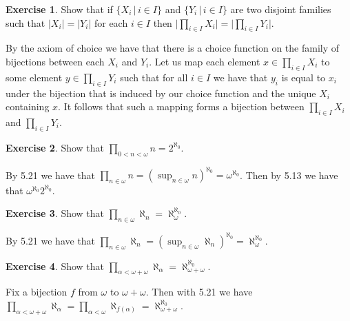 \documentclass{article}
\theoremstyle{definition}
\newtheorem{exer}{Exercise}[section]
\newcommand{\abs}[1]{\lvert#1\rvert}
\newlength{\defparindent}
\newenvironment{answer}
    {\begin{mdframed}[backgroundcolor=gray!15, linewidth=0pt] \setlength{\parindent}{\defparindent}}
    {\end{mdframed}}
\begin{document}
\begin{exer}
    Show that if $\{ X_i \, | \, i \in I \}$ and $\{ Y_i \, | \, i \in I \}$ are two disjoint families such that $\abs{X_i} = \abs{Y_i}$ for each $i \in I$ then $\abs{\prod_{i \in I} X_i} = \abs{\prod_{i \in I} Y_i}$.
    \begin{answer}
        By the axiom of choice we have that there is a choice function on the family of bijections between each $X_i$ and $Y_i$. Let us map each element $x \in \prod_{i \in I} X_i$ to some element $y \in \prod_{i \in I} Y_i$ such that for all $i \in I$ we have that $y_i$ is equal to $x_i$ under the bijection that is induced by our choice function and the unique $X_i$ containing $x$. It follows that such a mapping forms a bijection between $\prod_{i \in I} X_i$ and $\prod_{i \in I} Y_i$.
    \end{answer}
\end{exer}

\newpage

\begin{exer}
    Show that $\prod_{0 < n < \omega} n = 2^{\aleph_0}$.
    \begin{answer}

        By 5.21 we have that $\prod_{n \in \omega} n = (\sup_{n \in \omega} n)^{\aleph_0} = \omega^{\aleph_0}$. Then by 5.13 we have that $\omega^{\aleph_0} 2^{\aleph_0}$. 
    \end{answer}
\end{exer}

\begin{exer}
    Show that $\prod_{n \in \omega} \aleph_n = \aleph_{\omega}^{\aleph_0}$.
    \begin{answer}
        By 5.21 we have that $\prod_{n \in \omega} \aleph_n = (\sup_{n \in \omega} \aleph_n)^{\aleph_0} = \aleph_{\omega}^{\aleph_0}$.
    \end{answer}
\end{exer}

\begin{exer}
    Show that $\prod_{\alpha < \omega + \omega} \aleph_\alpha = \aleph_{\omega + \omega}^{\aleph_0}$.
    \begin{answer}
        Fix a bijection $f$ from $\omega$ to $\omega + \omega$. Then with 5.21 we have $\prod_{\alpha < \omega + \omega} \aleph_\alpha = \prod_{\alpha < \omega} \aleph_{f(\alpha)} = \aleph_{\omega + \omega}^{\aleph_0}$.
    \end{answer}
\end{exer}
\end{document}

